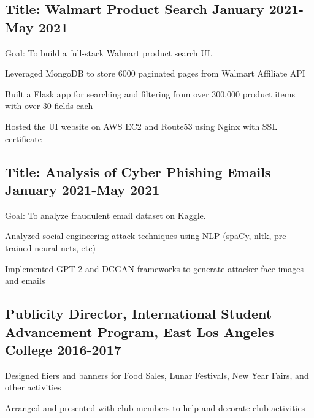 \documentclass[11pt]{article}
\begin{document}
\subsection*{Title: Walmart Product Search \hfill {\normalfont January 2021-May 2021}}
\noindent
\href{https://github.com/Anthonyive/DSCI-551-Project.git}{} Goal: To build a full-stack Walmart product search UI.
\begin{compactitem}
    \item Leveraged MongoDB to store 6000 paginated pages from Walmart 
        Affiliate API
    \item Built a Flask app for searching and filtering from over 300,000 
        product items with over 30 fields each
    \item Hosted the UI website on AWS EC2 and Route53 using Nginx with SSL 
        certificate
\end{compactitem}
\vspace{0.1in}

\subsection*{Title: Analysis of Cyber Phishing Emails \hfill 
{\normalfont January 2021-May 2021}}
\noindent
\href{https://github.com/Anthonyive/DSCI-550-Assignments.git}{} 
Goal: To analyze fraudulent email dataset on Kaggle.
\begin{compactitem}
 \item Analyzed social engineering attack techniques using NLP (spaCy, 
     nltk, pre-trained neural nets, etc)
 \item Implemented GPT-2 and DCGAN frameworks to generate attacker 
     face images and emails
\end{compactitem}
\vspace{0.1in}

\subsection*{Publicity Director{\normalfont, International Student Advancement Program, East Los Angeles College \hfill	2016-2017}}
\begin{compactitem}
    \item Designed fliers and banners for Food Sales, Lunar Festivals, 
        New Year Fairs, and other activities
    \item Arranged and presented with club members to help and decorate 
        club activities
\end{compactitem}
\end{document}
